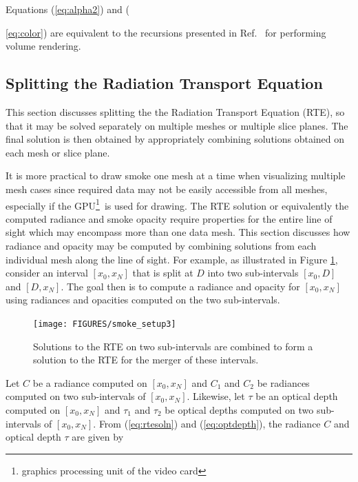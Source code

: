 Equations (\ref{eq:alpha2}) and ({\ref{eq:color}) are equivalent to the recursions presented in Ref.~\cite[Chapter 39]{gpugems} for performing volume rendering.


\subsection{Splitting the Radiation Transport Equation}
This section discusses splitting the the Radiation Transport Equation (RTE), so that it may be solved separately on multiple meshes or multiple slice planes.  The final solution is then obtained by  appropriately combining solutions obtained on each mesh or slice plane.

It is more practical to draw smoke one mesh at a time when visualizing multiple mesh cases since required data may not be easily accessible from all meshes, especially if the GPU\footnote{graphics processing unit of the video card}\ is used for drawing.  The RTE solution or equivalently the computed radiance and smoke opacity require  properties for the entire line of sight which may encompass more than one data mesh.  This section discusses how  radiance and opacity may be computed by combining solutions from each individual mesh along the line of sight.  For example, as illustrated in Figure \ref{figsmokesetup3}, consider an interval $[x_0,x_N]$ that is split at $D$ into two sub-intervals $[x_0,D]$ and $[D,x_N]$.  The goal then is to compute a radiance and opacity for $[x_0,x_N]$ using radiances and opacities computed on  the two sub-intervals.

\begin{figure}[\figoptions]
\begin{center}
\texttt{[image: FIGURES/smoke\_setup3]}
\end{center}
\caption {Solutions to the RTE on two sub-intervals are combined to form a solution to the RTE
for the merger of these intervals.}
\label{figsmokesetup3}
\end{figure}

Let $C$ be a radiance computed on $[x_0,x_N]$ and $C_1$ and $C_2$ be radiances computed on two sub-intervals of $[x_0,x_N]$.  Likewise, let $\tau$ be an optical depth computed on $[x_0,x_N]$ and $\tau_1$ and $\tau_2$ be optical depths computed on two sub-intervals of $[x_0,x_N]$.
From (\ref{eq:rtesoln}) and (\ref{eq:optdepth}), the radiance $C$ and optical depth $\tau$ are given by

}
